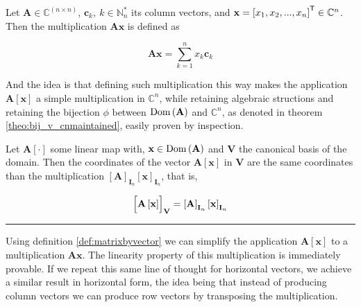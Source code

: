\begin{definition}\label{def:matrixbyvector} Let $\mathbf{A}\in\mathbb{C}^{(n\times n)}$, $\mathbf{c}_k,\ k\in\mathbb{N}^*_n$ its column vectors, and $\mathbf{x} = \left[x_1,x_2,...,x_n\right]^{\mathsf{T}}\in\mathbb{C}^n$. Then the multiplication $\mathbf{Ax}$ is defined as

\begin{equation} \mathbf{Ax} = \sum_{k=1}^n x_k\mathbf{c}_k \end{equation}
\end{definition}

	And the idea is that defining such multiplication this way makes the application $\mathbf{A}\left[\mathbf{x}\right]$ a simple multiplication in $\mathbb{C}^n$, while retaining algebraic structions and retaining the bijection $\phi$ between $\operatorname{Dom}\left(\mathbf{A}\right)$ and $\mathbb{C}^n$, as denoted in theorem \ref{theo:bij_v_cnmaintained}, easily proven by inspection.

\begin{theorem}\label{theo:bij_v_cnmaintained} Let $\mathbf{A}\left[\cdot\right]$ some linear map with, $\mathbf{x}\in\operatorname{Dom}\left(\mathbf{A}\right)$ and $\mathbf{V}$ the canonical basis of the domain. Then the coordinates of the vector $\mathbf{A}\left[\mathbf{x}\right]$ in $\mathbf{V}$ are the same coordinates than the multiplication $\left[\mathbf{A}\right]_{\mathbf{I}_n} \left[\mathbf{x}\right]_{\mathbf{I}_n}$, that is,

\begin{equation} \left[\raisebox{1mm}[2mm][2mm]{} \mathbf{A}\left[\mathbf{x}\right]\right]_\mathbf{V} = \left[\mathbf{A}\right]_{\mathbf{I}_n} \left[\mathbf{x}\right]_{\mathbf{I}_n}\end{equation}
\end{theorem}
\hrule
\vspace{3mm}

	Using definition \ref{def:matrixbyvector} we can simplify the application $\mathbf{A}\left[\mathbf{x}\right]$ to a multiplication $\mathbf{Ax}$. The linearity property of this multiplication is immediately provable. If we repeat this same line of thought for horizontal vectors, we achieve a similar result in horizontal form, the idea being that instead of producing column vectors we can produce row vectors by transposing the multiplication.

